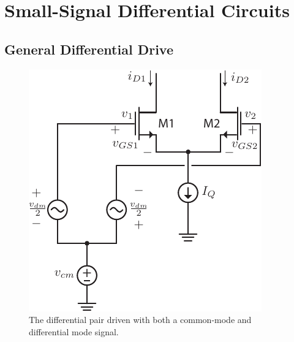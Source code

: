 \section{Small-Signal Differential Circuits}


\subsection{General Differential Drive}


\begin{figure}[tb]
\begin{center}
\includegraphics[scale=1]{Diff_Pair_Diff_CM.pdf}
\end{center}
\caption{The differential pair driven with both a common-mode and differential mode signal.} \label{fig:Diff_Pair_Diff_CM.pdf}
\end{figure}

